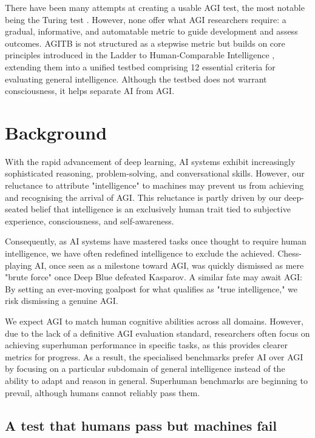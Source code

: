 \documentclass{article}
\begin{document}
There have been many attempts at creating a usable AGI test, the most notable being the Turing test \cite{Turing1950}. However, none offer what AGI researchers require: a gradual, informative, and automatable metric to guide development and assess outcomes. AGITB is not structured as a stepwise metric but builds on core principles introduced in the Ladder to Human-Comparable Intelligence \cite{Sprogar2018}, extending them into a unified testbed comprising 12 essential criteria for evaluating general intelligence. Although the testbed does not warrant consciousness, it helps separate AI from AGI.


\section{Background}

With the rapid advancement of deep learning, AI systems exhibit increasingly sophisticated reasoning, problem-solving, and conversational skills. However, our reluctance to attribute "intelligence" to machines may prevent us from achieving and recognising the arrival of AGI. This reluctance is partly driven by our deep-seated belief that intelligence is an exclusively human trait tied to subjective experience, consciousness, and self-awareness. 

Consequently, as AI systems have mastered tasks once thought to require human intelligence, we have often redefined intelligence to exclude the achieved. Chess-playing AI, once seen as a milestone toward AGI, was quickly dismissed as mere "brute force" once Deep Blue defeated Kasparov. A similar fate may await AGI: By setting an ever-moving goalpost for what qualifies as "true intelligence," we risk dismissing a genuine AGI. 

We expect AGI to match human cognitive abilities across all domains. However, due to the lack of a definitive AGI evaluation standard, researchers often focus on achieving superhuman performance in specific tasks, as this provides clearer metrics for progress. As a result, the specialised benchmarks prefer AI over AGI by focusing on a particular subdomain of general intelligence instead of the ability to adapt and reason in general. Superhuman benchmarks are beginning to prevail, although humans cannot reliably pass them.

\subsection{A test that humans pass but machines fail}
\end{document}

